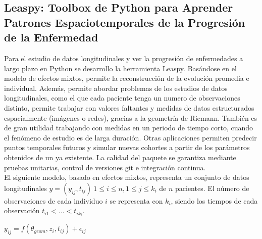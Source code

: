 	\subsection{Leaspy: Toolbox de Python para Aprender Patrones Espaciotemporales de la Progresión de la Enfermedad}
	
	Para el estudio de datos longitudinales y ver la progresión de enfermedades a largo plazo en Python se desarrollo la herramienta Leaspy. Basándose en el modelo de efectos mixtos, permite la reconstrucción de la evolución promedia e individual. Además, permite abordar problemas de los estudios de datos longitudinales, como el que cada paciente tenga un numero de observaciones distinto, permite trabajar con valores faltantes y medidas de datos estructurados espacialmente (imágenes o redes), gracias a la geometría de Riemann. También es de gran utilidad trabajando con medidas en un periodo de tiempo corto, cuando el fenómeno de estudio es de larga duración. Otras aplicaciones permiten predecir puntos temporales futuros y simular nuevas cohortes a partir de los parámetros obtenidos de un ya existente. La calidad del paquete se garantiza mediante pruebas unitarias, control de versiones git e integración continua.\\
	
	El siguiente modelo, basado en efectos mixtos, representa un conjunto de datos longitudinales $y=(y_{ij},t_{ij})\ 1 \leq i \le n, 1 \le j \le k_{i}$ de $\textit{n}$ pacientes. El número de observaciones de cada individuo $i$ se representa con $k_{i}$, siendo los tiempos de cada observación $t_{i1} < ... < t_{ik_{i}}$.
	
	\begin{center}
		$y_{ij} = f(\theta_{geom}, z_{i}, t_{ij} ) + \epsilon_{ij}$
	\end{center}
	
